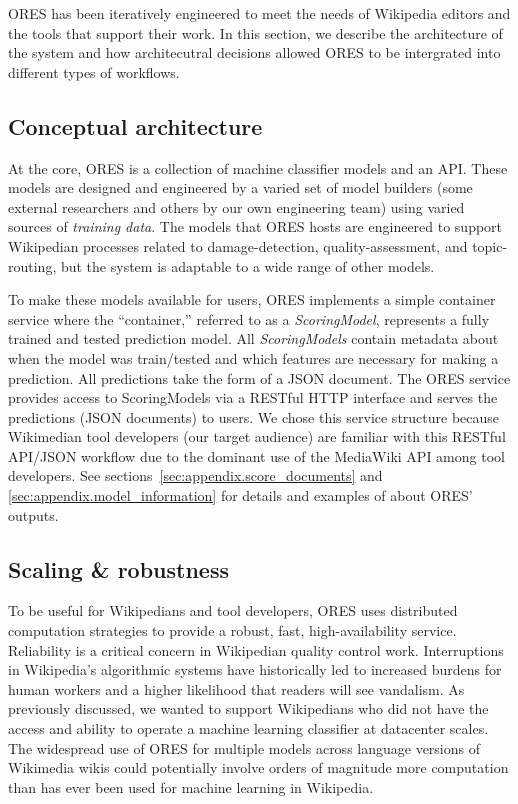 
ORES has been iteratively engineered to meet the needs of Wikipedia editors and the tools that support their work.  In this section, we describe the architecture of the system and how architecutral decisions allowed ORES to be intergrated into different types of workflows.

\subsection{Conceptual architecture}
At the core, ORES is a collection of machine classifier models and an API.  These models are designed and engineered by a varied set of model builders (some external researchers and others by our own engineering team) using varied sources of \emph{training data}.  The models that ORES hosts are engineered to support Wikipedian processes related to damage-detection, quality-assessment, and topic-routing, but the system is adaptable to a wide range of other models.

To make these models available for users, ORES implements a simple container service where the ``container,'' referred to as a \emph{ScoringModel}, represents a fully trained and tested prediction model.  All \emph{ScoringModels} contain metadata about when the model was train/tested and which features are necessary for making a prediction.  All predictions take the form of a JSON document.  The ORES service provides access to ScoringModels via a RESTful HTTP interface and serves the predictions (JSON documents) to users.  We chose this service structure because Wikimedian tool developers (our target audience) are familiar with this RESTful API/JSON workflow due to the dominant use of the MediaWiki API among tool developers.  See sections~\ref{sec:appendix.score_documents} and \ref{sec:appendix.model_information} for details and examples of about ORES' outputs.

\subsection{Scaling \& robustness}
To be useful for Wikipedians and tool developers, ORES uses distributed computation strategies to provide a robust, fast, high-availability service.  Reliability is a critical concern in Wikipedian quality control work.  Interruptions in Wikipedia's algorithmic systems have historically led to increased burdens for human workers and a higher likelihood that readers will see vandalism\cite{geiger2013levee}.  As previously discussed, we wanted to support Wikipedians who did not have the access and ability to operate a machine learning classifier at datacenter scales. The widespread use of ORES for multiple models across language versions of Wikimedia wikis could potentially involve orders of magnitude more computation than has ever been used for machine learning in Wikipedia.

